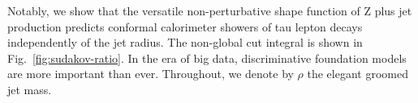 Notably, we show that the versatile non-perturbative shape function of Z
plus jet production predicts conformal calorimeter showers of tau lepton
decays independently of the jet radius. The non-global cut integral is
shown in Fig.~\ref{fig:sudakov-ratio}. In the era of big data,
discriminative foundation models are more important than ever.
Throughout, we denote by $\rho$ the elegant groomed jet mass.

